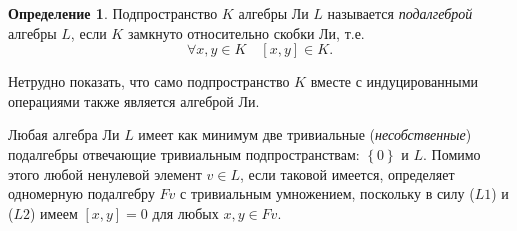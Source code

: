 \documentclass[a4paper, 12pt]{article}
\theoremstyle{definition}
\newtheorem{definition}{Определение}[section]
\begin{document}
\begin{definition}
    Подпространство \( K \) алгебры Ли \( L \) называется \textit{подалгеброй} алгебры \( L \), если \( K \) замкнуто относительно скобки Ли, т.е.
    \[
        \forall x, y \in K \quad [x, y] \in K.
    \]
\end{definition}

Нетрудно показать, что само подпространство \( K \) вместе с индуцированными операциями также является алгеброй Ли.

Любая алгебра Ли \( L \) имеет как минимум две тривиальные (\textit{несобственные}) подалгебры отвечающие тривиальным подпространствам: \( \left\{ 0 \right\} \) и \( L \).
Помимо этого любой ненулевой элемент \( v \in L \), если таковой имеется, определяет одномерную подалгебру \( Fv \) с тривиальным умножением, поскольку в силу (\( L 1 \)) и (\( L 2 \)) имеем \( [x, y] = 0 \) для любых \( x, y \in Fv \).
\end{document}

